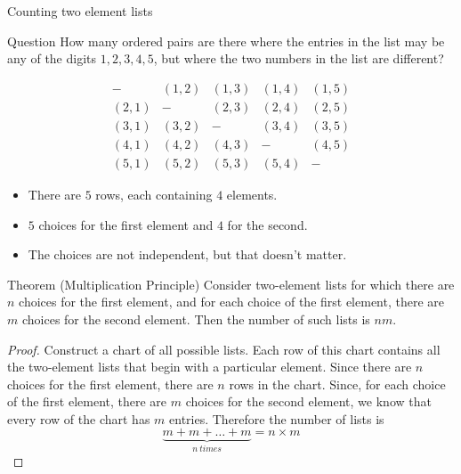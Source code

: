 \documentclass{beamer}
\begin{document}
\begin{frame}{Counting two element lists}
\begin{block}{Question}
How many ordered pairs are there where the entries in the list may be any of the digits $1,2,3,4,5$, but where the two numbers in the list are different?
\end{block}\pause
\[
\begin{array}{ccccc}
-&(1,2)&(1,3)&(1,4)&(1,5)\\
(2,1)&-&(2,3)&(2,4)&(2,5)\\
(3,1)&(3,2)&-&(3,4)&(3,5)\\
(4,1)&(4,2)&(4,3)&-&(4,5)\\
(5,1)&(5,2)&(5,3)&(5,4)& -
\end{array}
\]\pause
\begin{itemize}
\item There are $5$ rows, each containing $4$ elements. \pause
\item $5$ choices for the first element and $4$ for the second. \pause
\item The choices are not independent, but that doesn't matter.
\end{itemize}\pause
{}
\end{frame}

\begin{frame}
\begin{block}{Theorem (Multiplication Principle)}
Consider two-element lists for which there are $n$ choices for the first element, and for each choice of the first element, there are $m$ choices for the second element. Then the number of such lists is $nm$.
\end{block}\pause

\begin{proof}
Construct a chart of all possible lists. Each row of this chart contains all the two-element lists that begin with a particular element. Since there are $n$ choices for the first element, there are $n$ rows in the chart. Since, for each choice of the first element, there are $m$ choices for the second element, we know that every row of the chart has $m$ entries. Therefore the number of lists is
\[
\underbrace{m+m+\dots+m}_{n~times} = n\times m
\]
\end{proof}
\end{frame}
\end{document}
